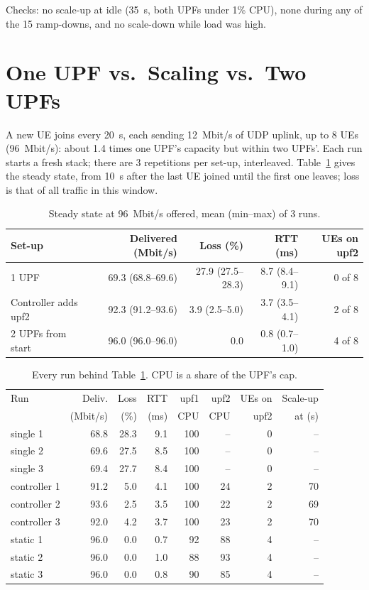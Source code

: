 \documentclass[conference]{IEEEtran}
\begin{document}
Checks: no scale-up at idle (35~s, both UPFs under 1\% CPU), none during any of the 15 ramp-downs, and no scale-down while load was high.

\section{One UPF vs.\ Scaling vs.\ Two UPFs}\label{sec:compare}
A new UE joins every 20~s, each sending 12~Mbit/s of UDP uplink, up to 8 UEs (96~Mbit/s): about 1.4 times one UPF's capacity but within two UPFs'. Each run starts a fresh stack; there are 3 repetitions per set-up, interleaved. Table~\ref{tab:cmp} gives the steady state, from 10~s after the last UE joined until the first one leaves; loss is that of all traffic in this window.

\begin{table}[t]
\centering
\caption{Steady state at 96~Mbit/s offered, mean (min--max) of 3 runs.}
\label{tab:cmp}
\footnotesize
\setlength{\tabcolsep}{3pt}
\begin{tabular}{lrrrr}
\toprule
Set-up & Delivered (Mbit/s) & Loss (\%) & RTT (ms) & UEs on upf2 \\
\midrule
1 UPF & 69.3 (68.8--69.6) & 27.9 (27.5--28.3) & 8.7 (8.4--9.1) & 0 of 8 \\
Controller adds upf2 & 92.3 (91.2--93.6) & 3.9 (2.5--5.0) & 3.7 (3.5--4.1) & 2 of 8 \\
2 UPFs from start & 96.0 (96.0--96.0) & 0.0 & 0.8 (0.7--1.0) & 4 of 8 \\
\bottomrule
\end{tabular}
\end{table}

\begin{table}[t]
\centering
\caption{Every run behind Table~\ref{tab:cmp}. CPU is a share of the UPF's cap.}
\label{tab:runs}
\footnotesize
\setlength{\tabcolsep}{2.5pt}
\begin{tabular}{lrrrrrrr}
\toprule
Run & Deliv. & Loss & RTT & upf1 & upf2 & UEs on & Scale-up \\
 & (Mbit/s) & (\%) & (ms) & CPU & CPU & upf2 & at (s) \\
\midrule
single 1 & 68.8 & 28.3 & 9.1 & 100 & -- & 0 & -- \\
single 2 & 69.6 & 27.5 & 8.5 & 100 & -- & 0 & -- \\
single 3 & 69.4 & 27.7 & 8.4 & 100 & -- & 0 & -- \\
controller 1 & 91.2 & 5.0 & 4.1 & 100 & 24 & 2 & 70 \\
controller 2 & 93.6 & 2.5 & 3.5 & 100 & 22 & 2 & 69 \\
controller 3 & 92.0 & 4.2 & 3.7 & 100 & 23 & 2 & 70 \\
static 1 & 96.0 & 0.0 & 0.7 & 92 & 88 & 4 & -- \\
static 2 & 96.0 & 0.0 & 1.0 & 88 & 93 & 4 & -- \\
static 3 & 96.0 & 0.0 & 0.8 & 90 & 85 & 4 & -- \\
\bottomrule
\end{tabular}
\end{table}
\end{document}
